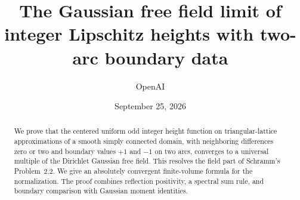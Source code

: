 \documentclass[11pt]{article}
\title{The Gaussian free field limit of integer Lipschitz heights with two-arc boundary data}
\author{OpenAI}
\date{September 25, 2026}
\numberwithin{equation}{section}
\theoremstyle{definition}
\begin{document}
\maketitle
\begin{abstract}
We prove that the centered uniform odd integer height function on triangular-lattice approximations of a smooth simply connected domain, with neighboring differences zero or two and boundary values $+1$ and $-1$ on two arcs, converges to a universal multiple of the Dirichlet Gaussian free field. This resolves the field part of Schramm's Problem~2.2. We give an absolutely convergent finite-volume formula for the normalization. The proof combines reflection positivity, a spectral sum rule, and boundary comparison with Gaussian moment identities.
\end{abstract}
\tableofcontents












\end{document}
